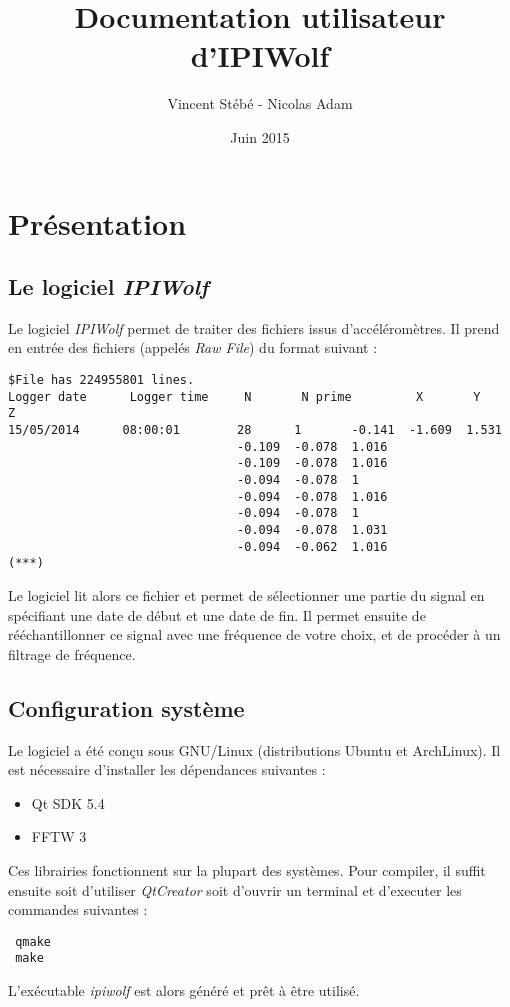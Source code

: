 \documentclass[a4paper,12pt]{article}
\begin{document}
\title{Documentation utilisateur d'IPIWolf}
\author{Vincent Stébé - Nicolas Adam}
\date{Juin 2015}

\maketitle

\newpage 
{}

\tableofcontents
\vspace{1cm}
\restoregeometry
\newpage

\section{Présentation}
\subsection{Le logiciel \emph{IPIWolf}}
Le logiciel \emph{IPIWolf} permet de traiter des fichiers issus d'accéléromètres.
Il prend en entrée des fichiers (appelés \emph{Raw File}) du format suivant :
\begin{verbatim}
$File has 224955801 lines.                                                                                                                            
Logger date      Logger time     N       N prime         X       Y       Z 
15/05/2014      08:00:01        28      1       -0.141  -1.609  1.531
                                -0.109  -0.078  1.016
                                -0.109  -0.078  1.016
                                -0.094  -0.078  1
                                -0.094  -0.078  1.016
                                -0.094  -0.078  1
                                -0.094  -0.078  1.031
                                -0.094  -0.062  1.016
(***)
\end{verbatim}
Le logiciel lit alors ce fichier et permet de sélectionner une partie du signal en spécifiant une date de début et une date de fin.
Il permet ensuite de rééchantillonner ce signal avec une fréquence de votre choix, et de procéder à un filtrage de fréquence.

\subsection{Configuration système}
Le logiciel a été conçu sous GNU/Linux (distributions Ubuntu et ArchLinux).
Il est nécessaire d'installer les dépendances suivantes :
\begin{itemize}
 \item Qt SDK 5.4
 \item FFTW 3
\end{itemize}
Ces librairies fonctionnent sur la plupart des systèmes.
Pour compiler, il suffit ensuite soit d'utiliser \emph{QtCreator} soit d'ouvrir un terminal et d'executer les commandes suivantes :
\begin{verbatim}
 qmake
 make
\end{verbatim}
L'exécutable \emph{ipiwolf} est alors généré et prêt à être utilisé.
\end{document}
